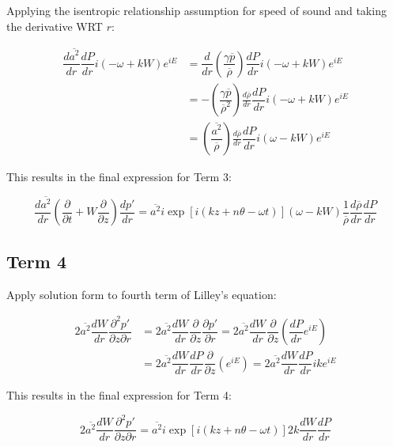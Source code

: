 \documentclass[]{aiaa-tc}%
\begin{document}
Applying the isentropic relationship assumption for speed of sound and taking the derivative WRT $r$:

\begin{align*}
\dfrac{d \overline{a^2}}{dr} \dfrac{dP}{dr}
    i(-\omega + kW) e^{iE}
&= \dfrac{d}{dr} \left(\dfrac{\gamma \overline{p}}{\overline{\rho}}\right)
    \dfrac{dP}{dr} i(-\omega + kW) e^{iE} \\
&= -\left(\dfrac{\gamma \overline{p}}{\overline{\rho}^2}\right) \frac{d \overline{\rho}}{dr}
    \dfrac{dP}{dr} i(-\omega + kW) e^{iE} \\
&= \left(\dfrac{\overline{a^2}}{\overline{\rho}}\right) \frac{d \overline{\rho}}{dr} \dfrac{dP}{dr} i(\omega - kW) e^{iE}
\end{align*}

This results in the final expression for Term 3:

\begin{equation} \label{term3soln}
\boxed{\dfrac{d \overline{a^2}}{dr} \left( \dfrac{\partial}{\partial t} + W \dfrac{\partial}{\partial z} \right) \dfrac{dp'}{dr}
= \overline{a^2} i\exp[i(kz + n\theta -\omega t)] (\omega - kW)
    \dfrac{1}{\overline{\rho}}\frac{d \overline{\rho}}{dr} \dfrac{dP}{dr} }
\end{equation}




\subsection{Term 4}

Apply solution form to fourth term of Lilley's equation:


\begin{align*}
2\overline{a^2} \dfrac{dW}{dr}\dfrac{\partial^2 p'}{\partial z \partial r}
  &= 2\overline{a^2} \dfrac{dW}{dr} \dfrac{\partial }{\partial z}
    \dfrac{\partial p'}{\partial r}
    = 2\overline{a^2} \dfrac{dW}{dr} \dfrac{\partial }{\partial z}
    \left( \dfrac{dP}{dr} e^{iE} \right) \\
&= 2\overline{a^2} \dfrac{dW}{dr} \dfrac{dP}{dr}
    \dfrac{\partial }{\partial z} \left( e^{iE} \right)
    = 2\overline{a^2} \dfrac{dW}{dr} \dfrac{dP}{dr} ike^{iE}
\end{align*}

This results in the final expression for Term 4:

\begin{equation} \label{term4soln}
\boxed{2\overline{a^2} \dfrac{dW}{dr}\dfrac{\partial^2p'}{\partial z\partial r}
  = \overline{a^2} i\exp[i(kz + n\theta -\omega t)]
    2k \dfrac{dW}{dr} \dfrac{dP}{dr} }
\end{equation}
\end{document}
